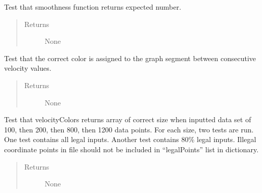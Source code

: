 \documentclass[letterpaper,10pt,english]{sphinxmanual}
\begin{document}
\begin{fulllineitems}
\begin{fulllineitems}
\label{\detokenize{index:src.Tests.Graph_Test.Graph_Test.test_smoothnessValues}}
Test that smoothness function returns expected number.
\begin{quote}\begin{description}
\item[{Returns}] \leavevmode
None

\end{description}\end{quote}

\end{fulllineitems}


\begin{fulllineitems}
\label{\detokenize{index:src.Tests.Graph_Test.Graph_Test.test_velocityColors}}
Test that the correct color is assigned to the graph segment between consecutive velocity values.
\begin{quote}\begin{description}
\item[{Returns}] \leavevmode
None

\end{description}\end{quote}

\end{fulllineitems}


\begin{fulllineitems}
\label{\detokenize{index:src.Tests.Graph_Test.Graph_Test.test_velocityColorsComputes_correctSize}}
Test that velocityColors returns array of correct size when inputted data set of 100, then 200, then 800,
then 1200 data points. For each size, two tests are run.
One test contains all legal inputs. Another test contains 80\% legal inputs.
Illegal coordinate points in file should not be included in “legalPoints” list in dictionary.
\begin{quote}\begin{description}
\item[{Returns}] \leavevmode
None


\end{description}
\end{quote}
\end{fulllineitems}
\end{fulllineitems}
\end{document}
